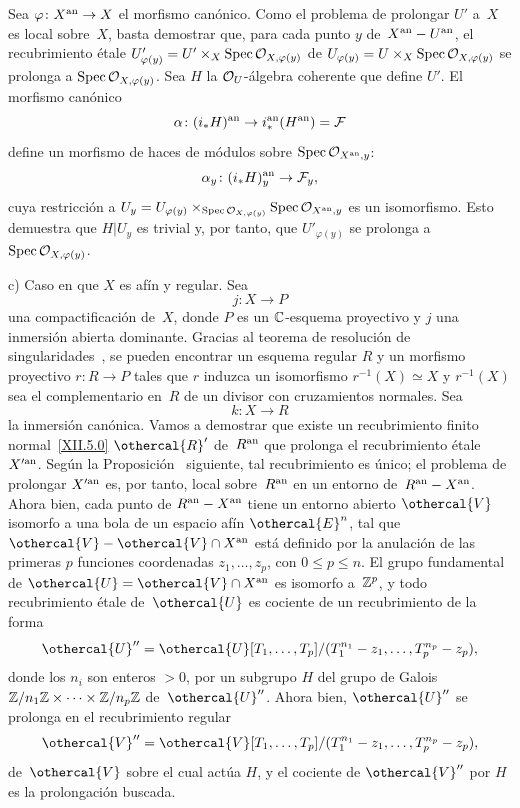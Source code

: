 Sea $\varphi\colon X^{\an}\to X$ el morfismo canónico. Como el problema
de prolongar $U'$ a~$X$ es local sobre~$X$, basta demostrar que, para
cada punto $y$ de~$X^{\an}-U^{\an}$, el recubrimiento étale
$U'_{\varphi(y)}=U'\times_X\Spec\cal{O}_{X,\varphi(y)}$ de
$U_{\varphi(y)}=U\times_X\Spec\cal{O}_{X,\varphi(y)}$ se prolonga a
$\Spec\cal{O}_{X,\varphi(y)}$. Sea $H$ la
$\cal{O}_U$-álgebra coherente que define $U'$. El morfismo canónico
$$
\alpha\colon(i_*H)^{\an}\to i_*^{\an}(H^{\an})=\cal{F}
$$
define un morfismo de haces de módulos sobre
$\Spec\cal{O}_{X^{\an},y}$:
$$
\alpha_y\colon(i_*H)^{\an}_y\to\cal{F}_y\quoi,
$$
cuya restricción a
$U_y=U_{\varphi(y)}\times_{\Spec\cal{O}_{X,\varphi(y)}}
\Spec\cal{O}_{X^{\an},y}$ es un isomorfismo. Esto demuestra que
$H|U_y$ es trivial y, por tanto, que $U'_{\varphi(y)}$ se prolonga a
$\Spec\cal{O}_{X,\varphi(y)}$.

c) Caso en que $X$ es afín y regular. Sea
$$
j\colon X\to P
$$
una compactificación de~$X$, donde $P$ es un $\CC$-esquema
proyectivo y $j$ una inmersión abierta dominante. Gracias al
teorema de resolución de singularidades~\cite{XII.8}, se pueden
encontrar un esquema regular $R$ y un morfismo proyectivo
$r\colon R\to P$ tales que $r$ induzca un isomorfismo
$r^{-1}(X)\simeq X$ y $r^{-1}(X)$ sea el complementario en~$R$
de un divisor con cruzamientos normales. Sea
$$
k\colon X\to R
$$
la inmersión canónica. Vamos a demostrar que existe un recubrimiento
finito normal~\eqref{XII.5.0} $\othercal{R}'$ de~$R^{\an}$ que prolonga
el recubrimiento étale $X^{\prime\an}$. Según la
Proposición~ siguiente, tal recubrimiento es único; el
problema de prolongar $X^{\prime\an}$ es, por tanto, local sobre~$R^{\an}$
en un entorno de~$R^{\an}-X^{\an}$. Ahora bien, cada punto de
$R^{\an}-X^{\an}$ tiene un entorno abierto $\othercal{V}$ isomorfo a una
bola de un espacio afín $\othercal{E}^n$, tal que
$\othercal{V}-\othercal{V}\cap X^{\an}$ está definido por la anulación de
las primeras $p$ funciones coordenadas $z_1,\dots,z_p$, con
$0\leq p\leq n$. El grupo fundamental de
$\othercal{U}=\othercal{V}\cap X^{\an}$ es isomorfo a~$\ZZ^p$, y todo
recubrimiento étale de~$\othercal{U}$ es cociente de un recubrimiento de
la forma
$$
\othercal{U}''=\othercal{U}[T_1,\dots,T_p]/
(T_1^{n_1}-z_1,\dots,T_p^{n_p}-z_p)\quoi,
$$
donde los $n_i$ son enteros $>0$, por un subgrupo $H$ del grupo de
Galois $\ZZ/n_1\ZZ\times\cdots\times\ZZ/n_p\ZZ$ de~$\othercal{U}''$.
Ahora bien, $\othercal{U}''$ se prolonga en el recubrimiento regular
$$
\othercal{V}''=\othercal{V}[T_1,\dots,T_p]/
(T_1^{n_1}-z_1,\dots,T_p^{n_p}-z_p)\quoi,
$$
de~$\othercal{V}$ sobre el cual actúa $H$, y el cociente de
$\othercal{V}''$ por $H$ es la prolongación buscada.

